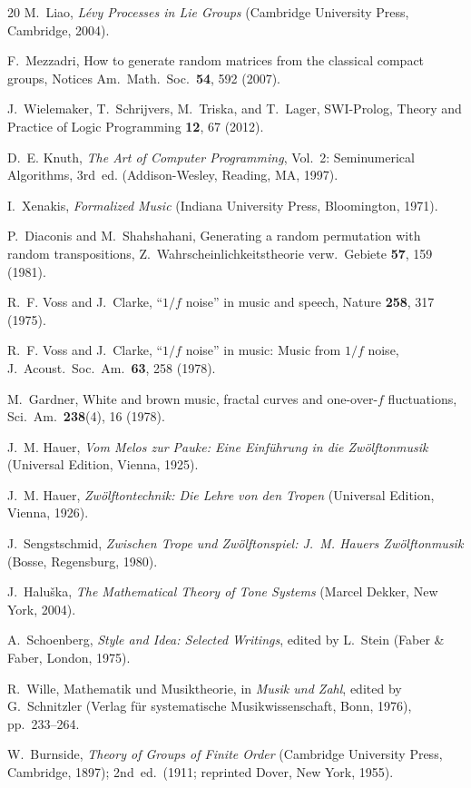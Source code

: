 \documentclass[
  twocolumn,
  aps,
  pra,
  showkeys,
  amsmath,amssymb,
  longbibliography
]{revtex4-2}
\begin{document}
\begin{thebibliography}{20}
M.~Liao,
\emph{L\'evy Processes in Lie Groups}
(Cambridge University Press, Cambridge, 2004).

F.~Mezzadri,
How to generate random matrices from the classical compact
groups,
Notices Am.\ Math.\ Soc.\ \textbf{54}, 592 (2007).

J.~Wielemaker, T.~Schrijvers, M.~Triska, and T.~Lager,
{SWI-Prolog},
Theory and Practice of Logic Programming \textbf{12}, 67
(2012).

D.~E. Knuth,
\emph{The Art of Computer Programming},
Vol.~2: Seminumerical Algorithms, 3rd~ed.
(Addison-Wesley, Reading, MA, 1997).

I.~Xenakis,
\emph{Formalized Music}
(Indiana University Press, Bloomington, 1971).

P.~Diaconis and M.~Shahshahani,
Generating a random permutation with random transpositions,
Z.\ Wahrscheinlichkeitstheorie verw.\ Gebiete \textbf{57},
159 (1981).

R.~F. Voss and J.~Clarke,
``$1/f$ noise'' in music and speech,
Nature \textbf{258}, 317 (1975).

R.~F. Voss and J.~Clarke,
``$1/f$ noise'' in music: Music from $1/f$ noise,
J.\ Acoust.\ Soc.\ Am.\ \textbf{63}, 258 (1978).

M.~Gardner,
White and brown music, fractal curves and one-over-$f$
fluctuations,
Sci.\ Am.\ \textbf{238}(4), 16 (1978).

J.~M. Hauer,
\emph{Vom Melos zur Pauke: Eine Einf\"uhrung in die
Zw\"olftonmusik}
(Universal Edition, Vienna, 1925).

J.~M. Hauer,
\emph{Zw\"olftontechnik: Die Lehre von den Tropen}
(Universal Edition, Vienna, 1926).

J.~Sengstschmid,
\emph{Zwischen Trope und Zw\"olftonspiel:
J.~M. Hauers Zw\"olftonmusik}
(Bosse, Regensburg, 1980).

J.~Halu\v{s}ka,
\emph{The Mathematical Theory of Tone Systems}
(Marcel Dekker, New York, 2004).

A.~Schoenberg,
\emph{Style and Idea: Selected Writings},
edited by L.~Stein
(Faber \& Faber, London, 1975).

R.~Wille,
Mathematik und Musiktheorie,
in \emph{Musik und Zahl},
edited by G.~Schnitzler
(Verlag f\"ur systematische Musikwissenschaft, Bonn, 1976),
pp.~233--264.

W.~Burnside,
\emph{Theory of Groups of Finite Order}
(Cambridge University Press, Cambridge, 1897);
2nd~ed.\ (1911; reprinted Dover, New York, 1955).

\end{thebibliography}
\end{document}
